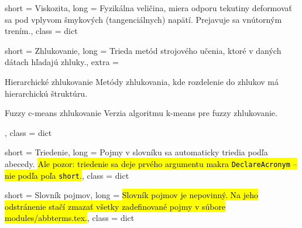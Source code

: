 

 {
	short = Viskozita,
	long = {Fyzikálna veličina, miera odporu tekutiny deformovať sa pod vplyvom šmykových (tangenciálnych) napätí. Prejavuje sa vnútorným trením.},
	class = dict
}


 {
	short = Zhlukovanie,
	long = {Trieda metód strojového učenia, ktoré v daných dátach hľadajú zhluky.},
	extra = {\begin{subdict}
			\item[Hierarchické zhlukovanie] Metódy zhlukovania, kde rozdelenie do zhlukov má hierarchickú štruktúru.
			\item[Fuzzy c-means zhlukovanie] Verzia algoritmu k-means pre fuzzy zhlukovanie.
		\end{subdict}
	},
	class = dict
}

 {
	short = Triedenie,
	long = {Pojmy v slovníku sa automaticky triedia podľa abecedy. \hl{Ale pozor: triedenie sa deje prvého argumentu makra \texttt{DeclareAcronym} -- nie podľa poľa \texttt{short}.}},
	class = dict
}

 {
	short = Slovník pojmov,
	long = {\hl{Slovník pojmov je nepovinný. Na jeho odstránenie stačí zmazať všetky zadefinované pojmy v súbore modules/abbterms.tex.}},
	class = dict
}








